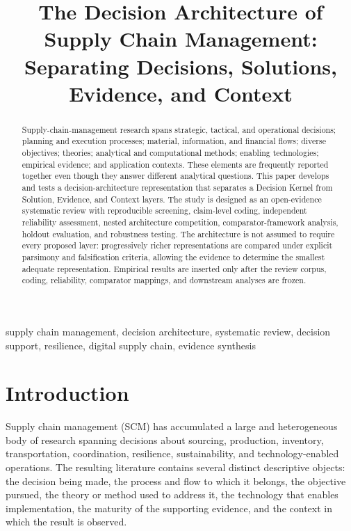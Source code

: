 \documentclass[journal]{IEEEtran}
\title{The Decision Architecture of Supply Chain Management: Separating Decisions, Solutions, Evidence, and Context}
\author{}
\begin{document}
\maketitle

\begin{abstract}
Supply-chain-management research spans strategic, tactical, and operational decisions; planning and execution processes; material, information, and financial flows; diverse objectives; theories; analytical and computational methods; enabling technologies; empirical evidence; and application contexts. These elements are frequently reported together even though they answer different analytical questions. This paper develops and tests a decision-architecture representation that separates a Decision Kernel from Solution, Evidence, and Context layers. The study is designed as an open-evidence systematic review with reproducible screening, claim-level coding, independent reliability assessment, nested architecture competition, comparator-framework analysis, holdout evaluation, and robustness testing. The architecture is not assumed to require every proposed layer: progressively richer representations are compared under explicit parsimony and falsification criteria, allowing the evidence to determine the smallest adequate representation. Empirical results are inserted only after the review corpus, coding, reliability, comparator mappings, and downstream analyses are frozen.
\end{abstract}

\begin{IEEEkeywords}
supply chain management, decision architecture, systematic review, decision support, resilience, digital supply chain, evidence synthesis
\end{IEEEkeywords}

\section{Introduction}
Supply chain management (SCM) has accumulated a large and heterogeneous body of research spanning decisions about sourcing, production, inventory, transportation, coordination, resilience, sustainability, and technology-enabled operations. The resulting literature contains several distinct descriptive objects: the decision being made, the process and flow to which it belongs, the objective pursued, the theory or method used to address it, the technology that enables implementation, the maturity of the supporting evidence, and the context in which the result is observed.
\end{document}
